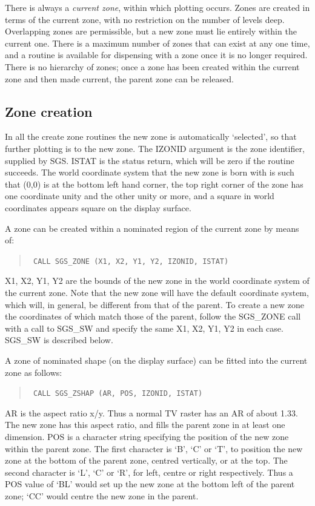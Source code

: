 \documentclass[11pt]{article}
\newcommand{\htmlref}[2]{#1}
\begin{document}
There is always a {\em current zone}, within which plotting
occurs.  Zones are created in terms of the current
zone, with no restriction on the number of levels deep.  Overlapping
zones are permissible, but a new zone
must lie entirely within the
current one.  There is a maximum number of
zones that can exist at any one time, and a routine is available for
dispensing with a zone once it is no longer required.  There
is no hierarchy of zones;  once a zone has been created within
the current zone and then made current, the
parent zone can be
released.

\subsection {Zone creation}

In all the create \htmlref{zone}{zones}
routines the new zone is automatically `selected',
so that further plotting is to the new zone.  The IZONID
argument is the zone identifier, supplied by SGS.  ISTAT
is the status return, which will be zero if the routine succeeds.  The
world coordinate system that the new zone is born with is such
that (0,0) is at the bottom left hand corner,
the top right
corner of the zone has one
coordinate unity and the other unity or more,
and a
square in world coordinates appears square
on the display surface.

A zone can be created within a nominated region of the current
zone by means of:
\begin{quote}{\tt
    CALL \htmlref{SGS\_ZONE}{SGS_ZONE} (X1, X2, Y1, Y2, IZONID, ISTAT)}
\end{quote}
X1, X2, Y1, Y2 are the bounds of the new zone in the world coordinate
system of the current zone.  Note that the new zone will have
the default coordinate system, which will, in general, be
different from that of the parent.  To create a new zone the
coordinates of which match those of the parent, follow the
SGS\_ZONE call with a call to \htmlref{SGS\_SW}{SGS_SW} and specify the same
X1, X2, Y1, Y2 in each case.  SGS\_SW is described below.

A zone of nominated shape (on the
display surface) can be fitted into the current zone as
follows:
\begin{quote}{\tt
    CALL \htmlref{SGS\_ZSHAP}{SGS_ZSHAP} (AR, POS, IZONID, ISTAT)}
\end{quote}
AR is the aspect ratio x/y.  Thus a normal TV raster has an
AR of about 1.33.  The new zone has this aspect ratio,
and fills the parent zone in at least one dimension.  POS
is a character string specifying the position of the new zone
within the parent zone.  The first character is `B', `C'
or `T', to position the new zone at the bottom of the
parent zone, centred vertically, or at the top.  The second character
is `L', `C' or
`R', for left, centre or right respectively.  Thus a POS value
of `BL' would set up the new zone at the bottom left of
the parent zone;  `CC' would centre the new zone in the parent.
\end{document}
